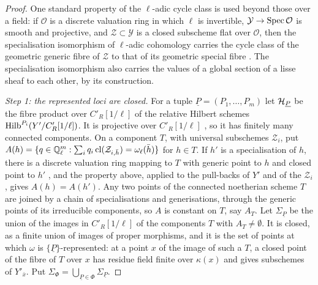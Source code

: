 \begin{proof}
One standard property of the $\ell$-adic cycle class is used beyond those over
a field: if $\mathcal{O}$ is a discrete valuation ring in which $\ell$ is
invertible, $\mathcal{Y}\to\operatorname{Spec}\mathcal{O}$ is smooth and projective, and
$\mathcal{Z}\subset\mathcal{Y}$ is a closed subscheme flat over $\mathcal{O}$,
then the specialisation isomorphism of $\ell$-adic cohomology carries the
cycle class of the geometric generic fibre of $\mathcal{Z}$ to that of its
geometric special fibre \cite[Cycle]{SGA4h}. The specialisation isomorphism
also carries the values of a global section of a lisse sheaf to each other,
by its construction.

\emph{Step 1: the represented loci are closed.} For a tuple
$\underline{P}=(P_{1},\dots,P_{m})$ let $\mathcal{H}_{\underline{P}}$ be the fibre
product over $C'_{R}[1/\ell]$ of the relative Hilbert schemes
$\operatorname{Hilb}^{P_{i}}(Y'/C'_{R}[1/\ell])$. It is projective over $C'_{R}[1/\ell]$
\cite{Gro61}, so it has finitely many connected components. On a component
$T$, with universal subschemes $\mathcal{Z}_{i}$, put $A(h)=\{q\in
\mathbb{Q}_{\ell}^{m}:\sum_{i}q_{i}\operatorname{cl}(\mathcal{Z}_{i,\bar{h}})
=\omega_{\ell}(\bar{h})\}$ for $h\in T$. If $h'$ is a specialisation of $h$,
there is a discrete valuation ring mapping to $T$ with generic point to $h$ and
closed point to $h'$ \cite[Tag~054F]{Stacks}, and the property above, applied
to the pull-backs of $Y'$ and of the $\mathcal{Z}_{i}$, gives $A(h)=A(h')$.
Any two points of the connected noetherian scheme $T$ are joined by a chain of
specialisations and generisations, through the generic points of its
irreducible components, so $A$ is constant on $T$, say $A_{T}$. Let
$\Sigma_{\underline{P}}$ be the union of the images in $C'_{R}[1/\ell]$ of the
components $T$ with $A_{T}\ne\emptyset$. It is closed, as a finite union of
images of proper morphisms, and it is the set of points at which $\omega$ is
$\{\underline{P}\}$-represented: at a point $x$ of the image of such a $T$, a
closed point of the fibre of $T$ over $x$ has residue field finite over
$\kappa(x)$ and gives subschemes of $Y'_{\bar{x}}$. Put
$\Sigma_{\Phi}=\bigcup_{\underline{P}\in\Phi}\Sigma_{\underline{P}}$.


\end{proof}
